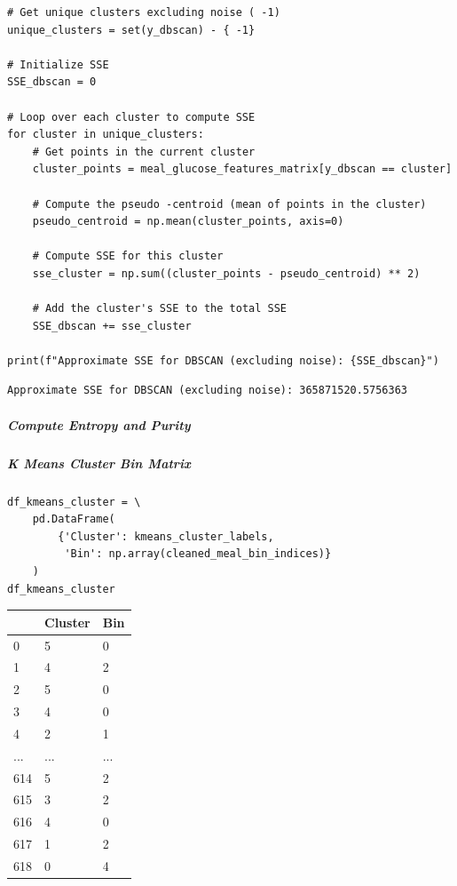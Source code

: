 \begin{verbatim}
# Get unique clusters excluding noise ( -1)
unique_clusters = set(y_dbscan) - { -1}

# Initialize SSE
SSE_dbscan = 0

# Loop over each cluster to compute SSE
for cluster in unique_clusters:
    # Get points in the current cluster
    cluster_points = meal_glucose_features_matrix[y_dbscan == cluster]
    
    # Compute the pseudo -centroid (mean of points in the cluster)
    pseudo_centroid = np.mean(cluster_points, axis=0)
    
    # Compute SSE for this cluster
    sse_cluster = np.sum((cluster_points - pseudo_centroid) ** 2)
    
    # Add the cluster's SSE to the total SSE
    SSE_dbscan += sse_cluster

print(f"Approximate SSE for DBSCAN (excluding noise): {SSE_dbscan}")
\end{verbatim}

\begin{verbatim}
Approximate SSE for DBSCAN (excluding noise): 365871520.5756363
\end{verbatim}

\subparagraph{Compute Entropy and Purity}

\subparagraph{K Means Cluster Bin Matrix}

\begin{verbatim}
df_kmeans_cluster = \
    pd.DataFrame(
        {'Cluster': kmeans_cluster_labels,
         'Bin': np.array(cleaned_meal_bin_indices)}
    )
df_kmeans_cluster
\end{verbatim}

\bigskip\noindent
\begin{tabular}{p{}p{}p{}}
\toprule
 & Cluster & Bin \\
\hline
0 & 5 & 0 \\
\hline
1 & 4 & 2 \\
\hline
2 & 5 & 0 \\
\hline
3 & 4 & 0 \\
\hline
4 & 2 & 1 \\
\hline
... & ... & ... \\
\hline
614 & 5 & 2 \\
\hline
615 & 3 & 2 \\
\hline
616 & 4 & 0 \\
\hline
617 & 1 & 2 \\
\hline
618 & 0 & 4 \\
\hline
\bottomrule
\end{tabular}

